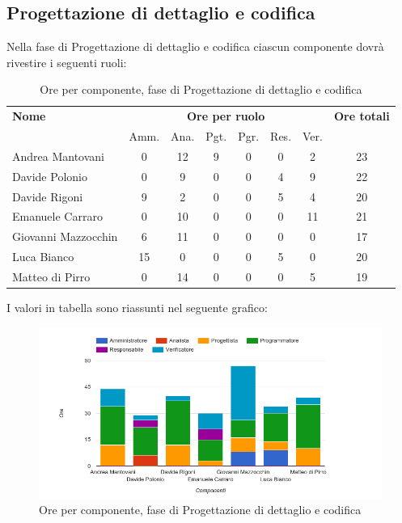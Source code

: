     
    
    
\pagebreak
\subsection{Progettazione di dettaglio e codifica}
Nella fase di Progettazione di dettaglio e codifica ciascun componente dovrà rivestire i seguenti ruoli:

\begin{table}[H]
\begin{tabular}{lccccccc}
\toprule
    \textbf{Nome}  & \multicolumn{6}{c}{\textbf{Ore per ruolo}} & \textbf{Ore totali} \\
     & Amm. & Ana. & Pgt. & Pgr. & Res. & Ver. & \\
    \midrule
    
	Andrea Mantovani & 0 & 12 & 9 & 0 & 0 & 2 & 23 \\
	Davide Polonio & 0 & 9 & 0 & 0 & 4 & 9 & 22 \\
	Davide Rigoni & 9 & 2 & 0 & 0 & 5 & 4 & 20 \\
	Emanuele Carraro & 0 & 10 & 0 & 0 & 0 & 11 & 21 \\
	Giovanni Mazzocchin & 6 & 11 & 0 & 0 & 0 & 0 & 17 \\
	Luca Bianco & 15 & 0 & 0 & 0 & 5 & 0 & 20 \\
	Matteo di Pirro & 0 & 14 & 0 & 0 & 0 & 5 & 19 \\
    
    \bottomrule
\end{tabular}
\caption{Ore per componente, fase di Progettazione di dettaglio e codifica}
\end{table}

I valori in tabella sono riassunti nel seguente grafico: \\ 

    \begin{figure}[H]
      \begin{center}
        \includegraphics[width=12cm]{res/img/orePerComponenteProgettazioneDettaglioCodifica.png}
      \caption{Ore per componente, fase di Progettazione di dettaglio e codifica}
      \end{center} 
    \end{figure}    
    
